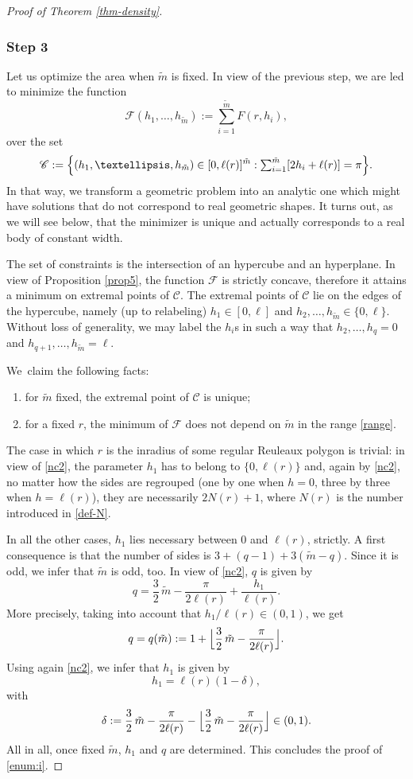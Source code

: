 \documentclass[11pt]{article}
\numberwithin{equation}{section}
\let\mathcal\mathscr
\let\sep :
\theoremstyle{plain}
\theoremstyle{definition}
\begin{document}
\begin{proof}[Proof of Theorem \ref{thm-density}]
\subsubsection*{Step 3} Let us optimize the area when $\tilde{m}$ is fixed. In view of the previous step, we are led to minimize the function
\[
\mathcal F(h_1,\ldots, h_{\tilde{m}}):=\sum_{i=1}^{\tilde{m}} F(r,h_i),
\]
over the set
\[
\mathcal C:=\Bigl\{ (h_1,\ldots, h_{\tilde{m}})\in [0,\ell(r)]^{\tilde{m}}\sep\textstyle \sum_{i=1}^{\tilde{m}} [2h_i + \ell(r)] = \pi\Bigr\}.
\]
In that way, we transform a geometric problem into an analytic one which might have
solutions that do not correspond to real geometric shapes. It turns out, as we will see
below, that the minimizer is unique and actually corresponds to a real body of constant width.

The set of constraints is the intersection of an hypercube and an hyperplane. In view of Proposition \ref{prop5}, the function $\mathcal F$ is strictly concave, therefore it attains a minimum on extremal points of $\mathcal C$. The extremal points of $\mathcal C$ lie on the edges of the hypercube, namely (up to relabeling) $h_1\in [0,\ell]$ and $h_2,\ldots, h_{\tilde{m}}\in \{0,\ell\}$. \hbox{Without} loss of generality, we may label the $h_i$s in such a way that $h_2,\ldots, h_q=0$ and $h_{q+1}, \ldots, h_{\tilde{m}}=\ell$.

We~claim the following facts:
\begin{enumerate}
\item\label{enum:i}
for $\tilde{m}$ fixed, the extremal point of $\mathcal C$ is unique;
\item\label{enum:ii}
for a fixed $r$, the minimum of $\mathcal F$ does not depend on $\tilde{m}$ in the range \eqref{range}.
\end{enumerate}
The case in which $r$ is the inradius of some regular Reuleaux polygon is trivial: in view of \eqref{nc2}, the parameter $h_1$ has to belong to $\{0,\ell(r)\}$ and, again by \eqref{nc2}, no matter how the sides are regrouped (one by one when $h=0$, three by three when $h=\ell(r)$), they are necessarily $2N(r)+1$, where $N(r)$ is the number introduced in \eqref{def-N}.

In all the other cases, $h_1$ lies necessary between $0$ and $\ell(r)$, strictly. A first consequence is that the number of sides is $3 + (q-1)+3(\tilde{m}-q)$. Since it is odd, we infer that $\tilde{m}$ is odd, too. In view of \eqref{nc2}, $q$ is given by
\[
q = \frac32\, \tilde{m} - \frac{\pi}{2\ell(r)}+ \frac{h_1}{\ell(r)}.
\]
More precisely, taking into account that $h_1/\ell(r) \in (0,1)$, we get
\[
q=q(\tilde{m}):=1+\Bigl\lfloor \frac32\, \tilde{m} - \frac{\pi}{2\ell(r)} \Bigr\rfloor.
\]
Using again \eqref{nc2}, we infer that $h_1$ is given by
\[
h_1=\ell(r)(1-\delta),
\]
with
\[
\delta:= \frac32\, \tilde{m} - \frac{\pi}{2\ell(r)} - \Bigl\lfloor \frac32\, \tilde{m} - \frac{\pi}{2\ell(r)}\Bigr\rfloor \in (0,1).
\]
All in all, once fixed $\tilde{m}$, $h_1$ and $q$ are determined. This concludes the proof of \eqref{enum:i}.


\end{proof}
\end{document}
